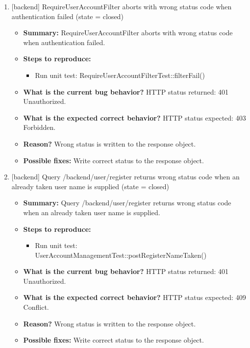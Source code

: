 \begin{enumerate}
\item {[backend] RequireUserAccountFilter aborts with wrong status code when authentication failed (state = closed)}
\begin{itemize}	
	\item \textbf{Summary: } RequireUserAccountFilter aborts with wrong status code when authentication failed.\\
	\item \textbf{Steps to reproduce: }
	\begin{itemize}
		\item Run unit test: RequireUserAccountFilterTest::filterFail()\\
	\end{itemize}
	\item \textbf{What is the current bug behavior? }HTTP status returned: 401 Unauthorized.\\
	\item \textbf{What is the expected correct behavior? }HTTP status expected: 403 Forbidden.\\
	\item \textbf{Reason? }Wrong status is written to the response object.\\
	\item \textbf{Possible fixes: }Write correct status to the response object.\\
\end{itemize}

\item {[backend] Query /backend/user/register returns wrong status code when an already taken user name is supplied (state = closed)}
\begin{itemize}	
	\item \textbf{Summary: }Query /backend/user/register returns wrong status code when an already taken user name is supplied.\\
	\item \textbf{Steps to reproduce: }
	\begin{itemize}
		\item Run unit test: UserAccountManagementTest::postRegisterNameTaken()\\
	\end{itemize}
	\item \textbf{What is the current bug behavior? }HTTP status returned: 401 Unauthorized.\\
	\item \textbf{What is the expected correct behavior? }HTTP status expected: 409 Conflict.\\
	\item \textbf{Reason? }Wrong status is written to the response object.\\
	\item \textbf{Possible fixes: }Write correct status to the response object.\\
\end{itemize}



\end{enumerate}
